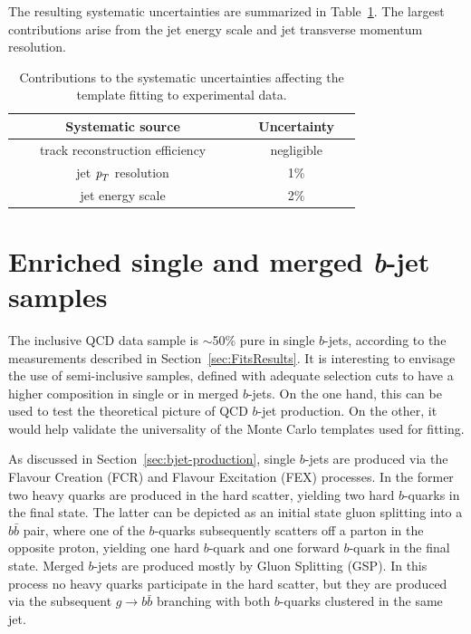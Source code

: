 The resulting systematic uncertainties are summarized in Table~\ref{tb:systematicsfits}. The largest contributions arise from the jet energy scale and jet transverse momentum resolution.
\begin{table}[!hbt] %
\renewcommand{\arraystretch}{1.2}
\centering
\begin{tabular}{ | c | c |}
\hline
  ~~~~~~~Systematic source~~~~~~~ &~~Uncertainty~~\\ \hline
  track reconstruction efficiency  &    negligible        \\ 
  jet ${\emph{p}_{T}}$ resolution  &    1\%        \\  
  jet energy scale  &    2\%        \\ 
\hline 
\end{tabular}
\caption{Contributions to the systematic uncertainties affecting the template fitting to experimental data.}
\label{tb:systematicsfits}
\end{table}


\section{Enriched single and merged {\em b}-jet samples}\label{sec:Enriched}

The inclusive QCD data sample is $\sim$50\% pure in single $b$-jets, according to the measurements described in Section~\ref{sec:FitsResults}. It is interesting to envisage the use of semi-inclusive samples, defined with adequate selection cuts to have a higher composition in single or in merged $b$-jets. On the one hand, this can be used to test the theoretical picture of QCD $b$-jet production. On the other, it would help validate the universality of the Monte Carlo templates used for fitting. 

As discussed in Section~\ref{sec:bjet-production}, single $b$-jets are produced via the Flavour Creation (FCR) and Flavour Excitation (FEX) processes.  In the former two heavy quarks are produced in the hard scatter, yielding two hard $b$-quarks in the final state. The latter can be depicted as an initial state gluon splitting into a $b\bar{b}$ pair, where one of the $b$-quarks subsequently scatters off a parton in the opposite proton, yielding one hard $b$-quark and one forward $b$-quark in the final state.
Merged $b$-jets are produced mostly by Gluon Splitting (GSP). In this process no heavy quarks participate in the hard scatter, but they are produced via the subsequent $g \rightarrow b\bar{b}$ branching with both $b$-quarks clustered in the same jet. 

